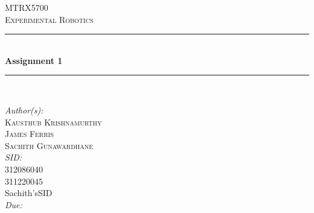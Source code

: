 \begin{titlepage}
	\newcommand{\HRule}{\rule{\linewidth}{0.5mm}}
	\center
	\textsc{\LARGE MTRX5700 \\[0.5cm]Experimental Robotics}\\[1cm] 
	\HRule \\[0.4cm]
	{ \huge \bfseries Assignment 1}\\[0.4cm] 
	\HRule \\[1.5cm]
	\begin{minipage}{1\textwidth}
		\large
		\flushleft
		\emph{Author(s):}\hspace{0.2cm}\textsc{\\Kausthub Krishnamurthy\\James Ferris\\Sachith Gunawardhane}\\ [0.25cm]
		\emph{SID:}\hspace{0.7cm}	\\312086040\\311220045\\Sachith'sSID\\[0.5cm]
		\emph{Due:}
		\hspace{0.55cm}{March 25, 2015}\hspace{1cm}\\[3cm]	%
	\end{minipage}
	\vfill
\end{titlepage}
